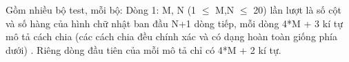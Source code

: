 Gồm nhiều bộ test, mỗi bộ: Dòng 1: M, N (1 $\le$ M,N $\le$ 20) lần lượt là số cột và số hàng của hình chữ nhật ban đầu N+1 dòng tiếp, mỗi dòng 4*M + 3 kí tự mô tả cách chia (các cách chia đều chính xác và có dạng hoàn toàn giống phía dưới) . Riêng dòng đầu tiên của mỗi mô tả chỉ có 4*M + 2 kí tự.